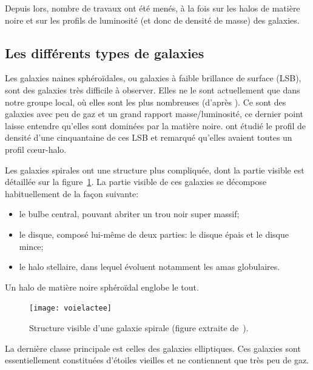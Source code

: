 			Depuis lors, nombre de travaux ont été menés, à la fois sur les halos de
			matière noire et sur les profils de luminosité (et donc de densité de masse)
			des galaxies.

		\subsection{Les différents types de galaxies}

			Les galaxies naines sphéroïdales, ou galaxies à faible brillance de surface (LSB), sont des
			galaxies très difficile à observer. Elles ne le sont actuellement que dans notre groupe local,
			où elles sont les plus nombreuses (d'après \citet{2013MNRAS.429.3068T}). Ce sont des galaxies
			avec peu de gaz et un grand rapport masse/luminosité, ce dernier point laisse entendre qu'elles
			sont dominées par la matière noire. \cite{2001ApJ...552L..23D} ont étudié le profil
			de densité d'une cinquantaine de ces LSB et remarqué qu'elles avaient toutes un profil cœur-halo.

			Les galaxies spirales ont une structure plus compliquée, dont la partie visible est détaillée sur la
			figure~\ref{Fig::Intro::schemaGS}.
			La partie visible de ces galaxies se décompose  habituellement de la façon suivante:
			\begin{itemize}
				\item le bulbe central, pouvant abriter un trou noir super massif;
				\item le disque, composé lui-même de deux parties: le disque épais
					et le disque mince;
				\item le halo stellaire, dans lequel évoluent notamment les amas globulaires.
			\end{itemize}
			Un halo de matière noire sphéroïdal englobe le tout.

			\begin{figure}[h]
				\begin{center}
					\texttt{[image: voielactee]}
				\end{center}
				\caption{Structure visible d'une galaxie spirale (figure extraite de~\citet{CoursJP}).\label{Fig::Intro::schemaGS}}
			\end{figure}

			La dernière classe principale est celles des galaxies elliptiques. Ces galaxies sont essentiellement
			constituées d'étoiles vieilles et ne contiennent que très
			peu de gaz.

